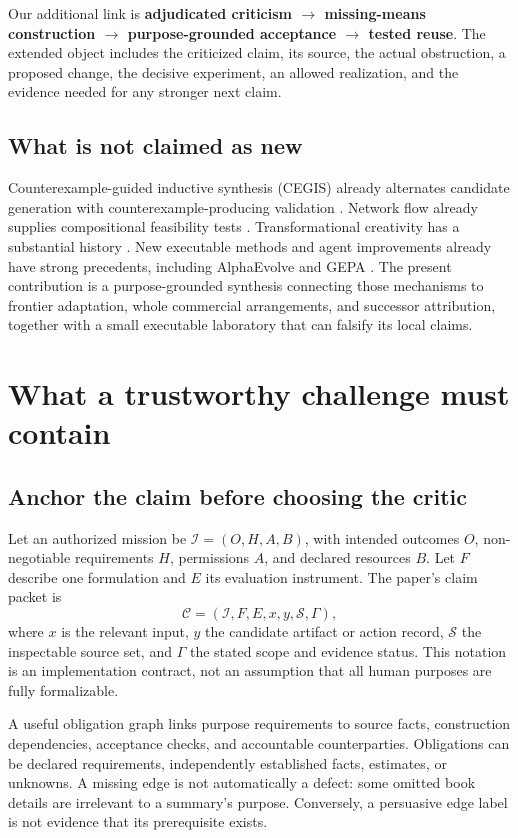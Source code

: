 \documentclass[11pt,a4paper]{article}
\newcommand{\term}[1]{\textbf{#1}}
\begin{document}
Our additional link is \term{adjudicated criticism $\rightarrow$ missing-means construction $\rightarrow$ purpose-grounded acceptance $\rightarrow$ tested reuse}. The extended object includes the criticized claim, its source, the actual obstruction, a proposed change, the decisive experiment, an allowed realization, and the evidence needed for any stronger next claim.

\subsection{What is not claimed as new}
Counterexample-guided inductive synthesis (CEGIS) already alternates candidate generation with counterexample-producing validation \cite{solar}. Network flow already supplies compositional feasibility tests \cite{ford}. Transformational creativity has a substantial history \cite{boden}. New executable methods and agent improvements already have strong precedents, including AlphaEvolve and GEPA \cite{alphaevolve,gepa}. The present contribution is a purpose-grounded synthesis connecting those mechanisms to frontier adaptation, whole commercial arrangements, and successor attribution, together with a small executable laboratory that can falsify its local claims.

\section{What a trustworthy challenge must contain}
\subsection{Anchor the claim before choosing the critic}
Let an authorized mission be $\mathcal I=(O,H,A,B)$, with intended outcomes $O$, non-negotiable requirements $H$, permissions $A$, and declared resources $B$. Let $F$ describe one formulation and $E$ its evaluation instrument. The paper's claim packet is
\begin{equation}
\mathcal C=(\mathcal I,F,E,x,y,\mathcal S,\Gamma),
\end{equation}
where $x$ is the relevant input, $y$ the candidate artifact or action record, $\mathcal S$ the inspectable source set, and $\Gamma$ the stated scope and evidence status. This notation is an implementation contract, not an assumption that all human purposes are fully formalizable.

A useful obligation graph links purpose requirements to source facts, construction dependencies, acceptance checks, and accountable counterparties. Obligations can be declared requirements, independently established facts, estimates, or unknowns. A missing edge is not automatically a defect: some omitted book details are irrelevant to a summary's purpose. Conversely, a persuasive edge label is not evidence that its prerequisite exists.
\end{document}
